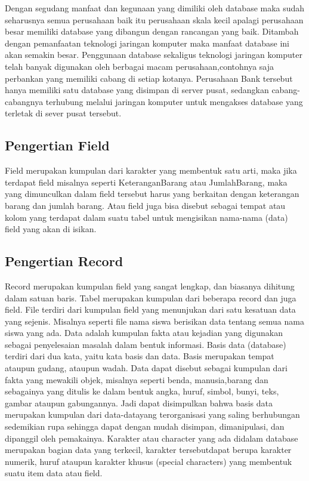 	Dengan segudang manfaat dan kegunaan yang dimiliki oleh database maka sudah seharusnya semua perusahaan baik itu perusahaan skala kecil apalagi perusahaan besar memiliki database yang dibangun dengan rancangan yang baik. Ditambah dengan pemanfaatan teknologi jaringan komputer maka manfaat database ini akan semakin besar. Penggunaan database sekaligus teknologi jaringan komputer telah banyak digunakan oleh berbagai macam perusahaan,contohnya saja perbankan yang memiliki cabang di setiap kotanya. Perusahaan Bank tersebut hanya memiliki satu database yang disimpan di server pusat, sedangkan cabang-cabangnya terhubung melalui jaringan komputer untuk mengakses database yang terletak di sever pusat tersebut.

\subsection{Pengertian Field} 
Field merupakan kumpulan dari karakter yang membentuk satu arti, maka jika terdapat field misalnya seperti KeteranganBarang atau JumlahBarang, maka yang dimunculkan dalam field tersebut harus yang berkaitan dengan keterangan barang dan jumlah barang. Atau field juga bisa disebut sebagai tempat atau kolom yang terdapat dalam suatu tabel untuk mengisikan nama-nama (data) field yang akan di isikan.

\subsection{Pengertian Record}
Record merupakan kumpulan field yang sangat lengkap, dan biasanya dihitung dalam satuan baris. Tabel merupakan kumpulan dari beberapa record dan juga field. File terdiri dari kumpulan field yang menunjukan dari satu kesatuan data yang sejenis. Misalnya seperti file nama siswa berisikan data tentang semua nama siswa yang ada. Data adalah kumpulan fakta atau kejadian yang digunakan sebagai penyelesaian masalah dalam bentuk informasi. Basis data (database) terdiri dari dua kata, yaitu kata basis dan data. Basis merupakan tempat ataupun gudang, ataupun wadah.
Data dapat disebut sebagai kumpulan dari fakta yang mewakili objek, misalnya seperti benda, manusia,barang dan sebagainya yang ditulis ke dalam bentuk angka, huruf, simbol, bunyi, teks, gambar ataupun gabungannya. Jadi dapat disimpulkan bahwa basis data merupakan kumpulan dari data-datayang terorganisasi yang saling berhubungan sedemikian rupa sehingga dapat dengan mudah disimpan, dimanipulasi, dan dipanggil oleh pemakainya. Karakter atau character yang ada didalam database merupakan bagian data yang terkecil, karakter tersebutdapat berupa karakter numerik, huruf ataupun karakter khusus (special characters) yang membentuk suatu item data atau field.

